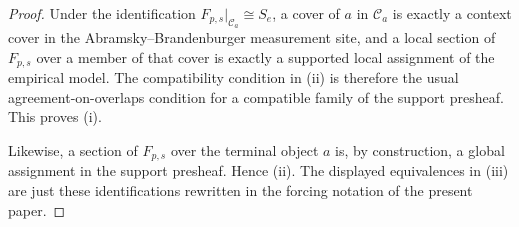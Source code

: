 \begin{proof}
Under the identification $F_{p,s}|_{\mathcal C_a}\cong S_e$, a cover of $a$ in $\mathcal C_a$ is exactly a context cover in the Abramsky--Brandenburger measurement site, and a local section of $F_{p,s}$ over a member of that cover is exactly a supported local assignment of the empirical model. The compatibility condition in (ii) is therefore the usual agreement-on-overlaps condition for a compatible family of the support presheaf. This proves \textup{(i)}.

Likewise, a section of $F_{p,s}$ over the terminal object $a$ is, by construction, a global assignment in the support presheaf. Hence \textup{(ii)}. The displayed equivalences in \textup{(iii)} are just these identifications rewritten in the forcing notation of the present paper.
\end{proof}

